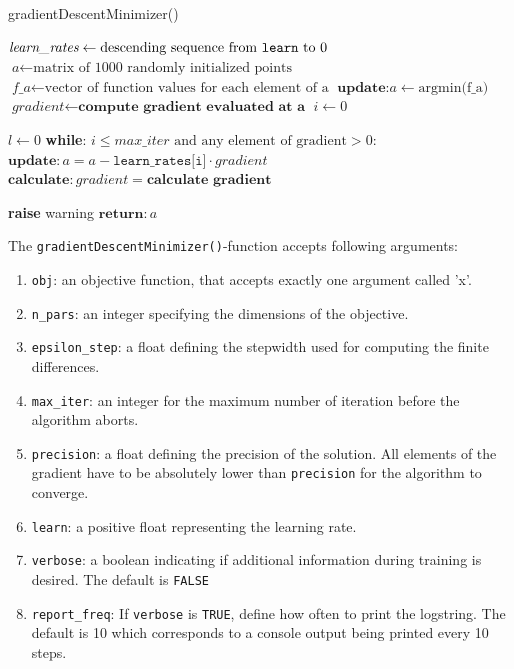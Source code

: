 \documentclass{article}
\begin{document}
\begin{algorithm}
\caption{gradientDescentMinimizer()}\label{GDM}
\begin{algorithmic}[1]
\State $\textit{learn\_rates}\gets \text{descending sequence from \texttt{learn} to 0}$
\State $\textit{a} \gets \text{matrix of 1000 randomly initialized points}$
\State $\textit{f\_a} \gets \text{vector of function values for each element of a}$
\State $\textbf{update:} a \gets \text{argmin(f\_a)}$
\State $\textit{gradient} \gets \textbf{compute gradient evaluated at a}$
\State $\textit{i} \gets 0$
\EndProcedure

\State $\textit{l} \gets 0$
\State \textbf{while}: $i \leq \textit{max\_iter} \text{ and any element of gradient} > 0:$
\State \qquad $\textbf{update}: a = a - \texttt{learn\_rates[i]} \cdot gradient$
\State \qquad $\textbf{calculate}: \textit{gradient} = \textbf{calculate gradient}$

 \textbf{raise} warning
\EndIf
\State $\textbf{return}: a$
\EndProcedure
\end{algorithmic}
\end{algorithm} 

The \texttt{gradientDescentMinimizer()}-function accepts following arguments:
\begin{enumerate}

\item \texttt{obj}: an objective function, that accepts exactly one argument called 'x'.
\item \texttt{n\_pars}: an integer specifying the dimensions of the objective.
\item \texttt{epsilon\_step}: a float defining the stepwidth used for computing the finite differences.
\item \texttt{max\_iter}: an integer for the maximum number of iteration before the algorithm aborts.
\item \texttt{precision}: a float defining the precision of the solution. All elements of the gradient have to be absolutely lower than \texttt{precision} for the algorithm to converge.
\item \texttt{learn}: a positive float representing the learning rate.
\item \texttt{verbose}: a boolean indicating if additional information during training is desired. The default is \texttt{FALSE}
\item \texttt{report\_freq}: If \texttt{verbose} is \texttt{TRUE}, define how often to print the logstring. The default is 10 which corresponds to a console output being printed every 10 steps.

\end{enumerate}
\end{document}

